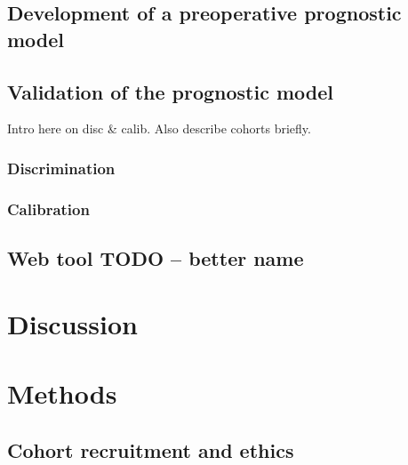 \documentclass[dissertation.tex]{subfiles}
\begin{document}
\subsection{Development of a preoperative prognostic model}

\subsection{Validation of the prognostic model}
Intro here on disc \& calib.  Also describe cohorts briefly.
\subsubsection{Discrimination}
\subsubsection{Calibration}

\subsection{Web tool TODO -- better name}

\section{Discussion}

\section{Methods}
\subsection{Cohort recruitment and ethics}
\label{subsec:nomo-methods-cohort}
\end{document}
